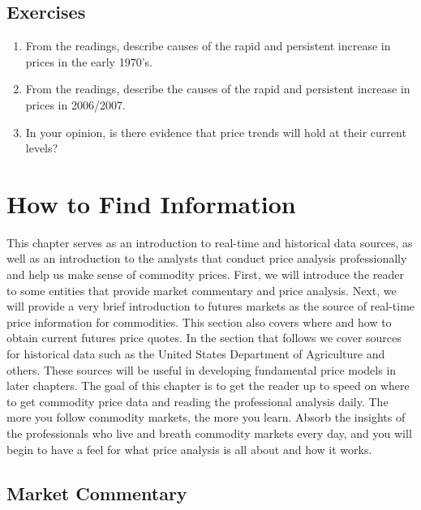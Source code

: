 \documentclass[
]{book}
\begin{document}
\hypertarget{exercises}{%
\section{Exercises}\label{exercises}}

\begin{enumerate}
\def\labelenumi{\arabic{enumi}.}
\item
  From the readings, describe causes of the rapid and persistent increase in prices in the early 1970's.
\item
  From the readings, describe the causes of the rapid and persistent increase in prices in 2006/2007.
\item
  In your opinion, is there evidence that price trends will hold at their current levels?
\end{enumerate}

\hypertarget{how-to-find-information}{%
\chapter{How to Find Information}\label{how-to-find-information}}

This chapter serves as an introduction to real-time and historical data sources, as well as an introduction to the analysts that conduct price analysis professionally and help us make sense of commodity prices. First, we will introduce the reader to some entities that provide market commentary and price analysis. Next, we will provide a very brief introduction to futures markets as the source of real-time price information for commodities. This section also covers where and how to obtain current futures price quotes. In the section that follows we cover sources for historical data such as the United States Department of Agriculture and others. These sources will be useful in developing fundamental price models in later chapters. The goal of this chapter is to get the reader up to speed on where to get commodity price data and reading the professional analysis daily. The more you follow commodity markets, the more you learn. Absorb the insights of the professionals who live and breath commodity markets every day, and you will begin to have a feel for what price analysis is all about and how it works.

\hypertarget{market-commentary}{%
\section{Market Commentary}\label{market-commentary}}
\end{document}
